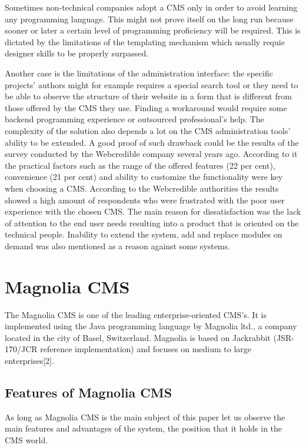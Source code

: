 Sometimes non-technical companies adopt a CMS only in order to avoid learning
any programming language. This might not prove itself on the long run because
sooner or later a certain level of programming proficiency will be required.
This is dictated by the limitations of the templating mechanism which usually
requie designer skills to be properly surpassed.

Another case is the limitations of the administration interface: the specific
projects' authors might for example requires a special search tool or they need
to be able to observe the structure of their website in a form that is different
from those offered by the CMS they use. Finding a workaround would require some
backend programming experience or outsourced professional's help.
The complexity of the solution also depends a lot on the CMS administration
tools' ability to be extended. A good proof of such drawback could be the
results of the survey conducted by the Webcredible company several years ago.
According to it the practical factors such as the range of the offered features
(22 per cent), convenience (21 per cent) and ability to customize the
functionality were key when choosing a CMS. According to the Webcredible
authorities the results showed a high amount of respondents who were frustrated
with the poor user experience with the chosen CMS. The main reason for
dissatisfaction was the lack of attention to the end user needs resulting into a
product that is oriented on the technical people. Inability to extend the
system, add and replace modules on demand was also mentioned as a reason against
some systems.

\section{Magnolia CMS}
The Magnolia CMS is one of the leading enterprise-oriented CMS's. It is
implemented using the Java programming language by Magnolia ltd., a company
located in the city of Basel, Switzerland. Magnolia is based on Jackrabbit
(JSR-170/JCR reference implementation) and focuses on medium to large
enterprises[2].

\subsection{Features of Magnolia CMS}
As long as Magnolia CMS is the main subject of this paper let us observe the
main features and advantages of the system, the position that it holds in the CMS world.

